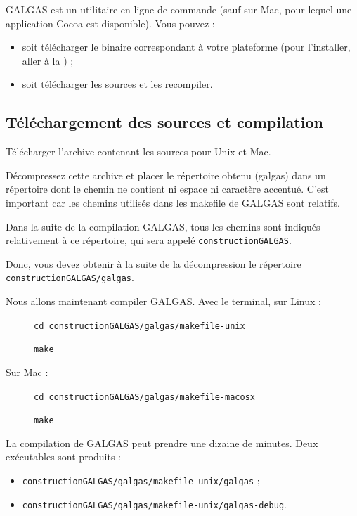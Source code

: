 GALGAS est un utilitaire en ligne de commande (sauf sur Mac, pour lequel une application Cocoa est disponible). Vous pouvez :
\begin{itemize}
  \item soit télécharger le binaire correspondant à votre plateforme (pour l'installer, aller à la ) ;
  \item soit télécharger les sources et les recompiler.
\end{itemize}




\subsection{Téléchargement des sources et compilation}

Télécharger l’archive contenant les sources pour Unix et Mac.

Décompressez cette archive et placer le répertoire obtenu (galgas) dans un répertoire dont le chemin ne contient ni espace ni caractère accentué. C'est important car les chemins utilisés dans les makefile de GALGAS sont relatifs.

Dans la suite de la compilation GALGAS, tous les chemins sont indiqués relativement à ce répertoire, qui sera appelé \texttt{constructionGALGAS}.

Donc, vous devez obtenir à la suite de la décompression le répertoire \texttt{constructionGALGAS/galgas}.

Nous allons maintenant compiler GALGAS. Avec le terminal, sur Linux :
\begin{description}
  \item[ ] \texttt{cd constructionGALGAS/galgas/makefile-unix}
  \item[ ] \texttt{make}
\end{description}

Sur Mac :
\begin{description}
  \item[ ] \texttt{cd constructionGALGAS/galgas/makefile-macosx}
  \item[ ] \texttt{make}
\end{description}

La compilation de GALGAS peut prendre une dizaine de minutes. Deux exécutables sont produits :

\begin{itemize}
  \item \texttt{constructionGALGAS/galgas/makefile-unix/galgas} ;
  \item \texttt{constructionGALGAS/galgas/makefile-unix/galgas-debug}.
\end{itemize}

